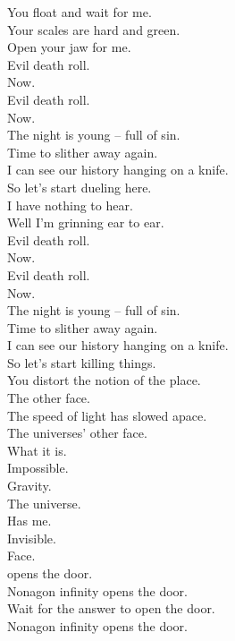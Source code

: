 You float and wait for me. \\
Your scales are hard and green. \\
Open your jaw for me. \\

Evil death roll. \\
Now. \\
Evil death roll. \\
Now. \\

The night is young -- full of sin. \\
Time to slither away again. \\
I can see our history hanging on a knife. \\

So let's start dueling here. \\
I have nothing to hear. \\
Well I'm grinning ear to ear. \\

Evil death roll. \\
Now. \\
Evil death roll. \\
Now. \\

The night is young -- full of sin. \\
Time to slither away again. \\
I can see our history hanging on a knife. \\

So let's start killing things. \\

You distort the notion of the place. \\
The  other face. \\
The speed of light has slowed apace. \\
The universes' other face. \\

What it is. \\
Impossible. \\
Gravity. \\
The universe. \\
Has me. \\
Invisible. \\
Face. \\

 opens the door. \\
Nonagon infinity opens the door. \\
Wait for the answer to open the door. \\
Nonagon infinity opens the door. \\

